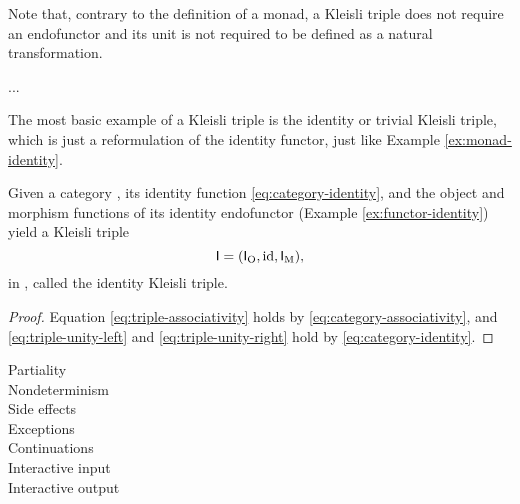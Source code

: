 \begin{remark*}
  \label{re:monad-triple}

  Note that, contrary to the definition of a monad, a Kleisli triple does not
  require an endofunctor and its unit is not required to be defined as
  a natural transformation.

\end{remark*}

...

\begin{example}
  \label{ex:triple-identity}

  The most basic example of a Kleisli triple is the identity or
  trivial Kleisli triple, which is just a reformulation of the
  identity functor, just like Example \ref{ex:monad-identity}.

  Given a category , its identity function
  \eqref{eq:category-identity}, and the object and morphism functions
  of its identity endofunctor (Example \ref{ex:functor-identity})
  yield a Kleisli triple
  \begin{equation*}
    \mathsf{I} = (\mathsf{I}_{\operatorname{O}}, \operatorname{id}, \mathsf{I}_{\operatorname{M}})
    \text{,}
  \end{equation*}
  in , called the identity Kleisli triple.

  \begin{proof}

    Equation \eqref{eq:triple-associativity} holds by
    \eqref{eq:category-associativity}, and \eqref{eq:triple-unity-left}
    and \eqref{eq:triple-unity-right} hold by
    \eqref{eq:category-identity}.

  \end{proof}

\end{example}

\begin{examples}
  \label{ex:triple-notions-computation}


  \hfill
  \begin{description}
  \item[Partiality]
  \item[Nondeterminism]
  \item[Side effects]
  \item[Exceptions]
  \item[Continuations]
  \item[Interactive input]
  \item[Interactive output]
  \end{description}
\end{examples}

